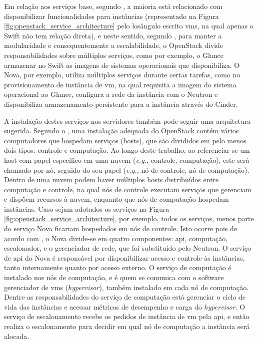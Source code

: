 Em relação aos serviços base, segundo , a maioria está relacionado com disponibilizar funcionalidades para instâncias (representado na Figura \ref{fig:openstack_service_architecture} pelo losângulo escrito \acp{vm}, na qual apenas o Swift não tem relação direta), e neste sentido, segundo , para manter a modularidade e consequentemente a escalabilidade, o OpenStack divide responsabilidades sobre múltiplos serviços, como por exemplo, o Glance armazenar no Swift as imagens de sistemas operacionais que disponibiliza.
%
O Nova, por exemplo, utiliza múltiplos serviços durante certas tarefas, como no provisionamento de instância de \ac{vm}, na qual requisita a imagem do sistema operacional ao Glance, configura a rede da instância com o Neutron e disponibiliza armazenamento persistente para a instância através do Cinder.




A instalação destes serviços nos servidores também pode seguir uma arquitetura sugerida.
%
Segundo o , uma instalação adequada do OpenStack contém vários computadores que hospedam serviços (hosts), que são divididos em pelo menos dois tipos: controle e computação.
%
Ao longo deste trabalho, ao referenciar-se um host com papel específico em uma nuvem (\textit{e.g.,} controle, computação), este será chamado por nó, seguido do seu papel (\textit{e.g.,} nó de controle, nó de computação). 
%
Dentro de uma nuvem podem haver múltiplos hosts distribuídos entre computação e controle, na qual nós de controle executam serviços que gerenciam e dispõem recursos à nuvem, enquanto que nós de computação hospedam instâncias.
%
Caso sejam adotados os serviços na Figura \ref{fig:openstack_service_architecture}, por exemplo, todos os serviços, menos parte do serviço Nova ficariam hospedados em nós de controle.
%
Isto ocorre pois de acordo com , o Nova divide-se em quatro componentes: \ac{api}, computação, escalonador, e o gerenciador de rede, que foi substituído pelo Neutron.
%
O serviço de \ac{api} do Nova é responsável por disponibilizar acesso e controle às instâncias, tanto internamente quanto por acesso externo.
%
O serviço de computação é instalado nos nós de computação, e é quem se comunica com o software gerenciador de \acp{vm} (\textit{hypervisor}), também instalado em cada nó de computação.
%
Dentre as responsabilidades do serviço de computação está gerenciar o ciclo de vida das instâncias e acessar métricas de desempenho e carga do \textit{hypervisor}.
%
O serviço de escalonamento recebe os pedidos de instância de \ac{vm} pela \ac{api}, e então realiza o escalonamento para decidir em qual nó de computação a instância será alocada.

